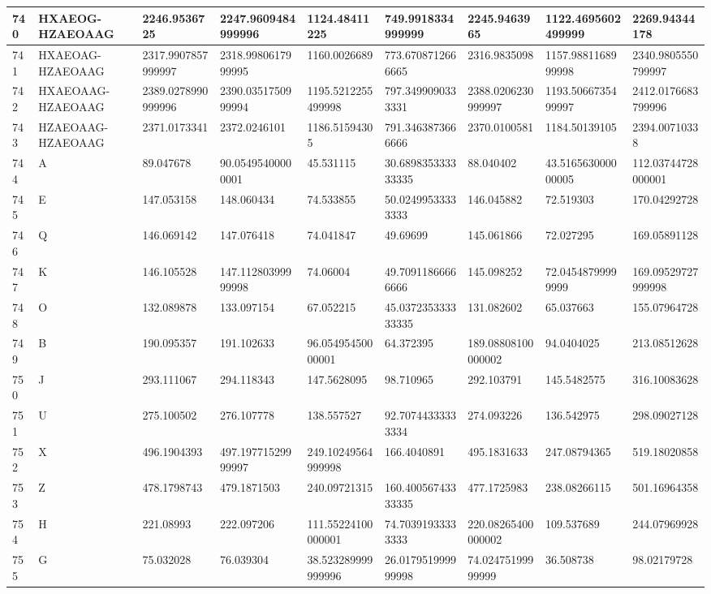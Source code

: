 {\begin{longtable}{|l|l|l|l|l|l|l|l|l|}
        740 & HXAEOG-HZAEOAAG & 2246.9536725 & 2247.9609484999996 & 1124.48411225 & 749.9918334999999 & 2245.9463965 & 1122.4695602499999 & 2269.94344178 \\ \hline
        741 & HXAEOAG-HZAEOAAG & 2317.9907857999997 & 2318.9980617999995 & 1160.0026689 & 773.6708712666665 & 2316.9835098 & 1157.9881168999998 & 2340.9805550799997 \\ \hline
        742 & HXAEOAAG-HZAEOAAG & 2389.0278990999996 & 2390.0351750999994 & 1195.5212255499998 & 797.3499090333331 & 2388.0206230999997 & 1193.5066735499997 & 2412.0176683799996 \\ \hline
        743 & HZAEOAAG-HZAEOAAG & 2371.0173341 & 2372.0246101 & 1186.51594305 & 791.3463873666666 & 2370.0100581 & 1184.50139105 & 2394.00710338 \\ \hline
        744 & A & 89.047678 & 90.05495400000001 & 45.531115 & 30.689835333333335 & 88.040402 & 43.516563000000005 & 112.03744728000001 \\ \hline
        745 & E & 147.053158 & 148.060434 & 74.533855 & 50.02499533333333 & 146.045882 & 72.519303 & 170.04292728 \\ \hline
        746 & Q & 146.069142 & 147.076418 & 74.041847 & 49.69699 & 145.061866 & 72.027295 & 169.05891128 \\ \hline
        747 & K & 146.105528 & 147.11280399999998 & 74.06004 & 49.70911866666666 & 145.098252 & 72.04548799999999 & 169.09529727999998 \\ \hline
        748 & O & 132.089878 & 133.097154 & 67.052215 & 45.037235333333335 & 131.082602 & 65.037663 & 155.07964728 \\ \hline
        749 & B & 190.095357 & 191.102633 & 96.05495450000001 & 64.372395 & 189.08808100000002 & 94.0404025 & 213.08512628 \\ \hline
        750 & J & 293.111067 & 294.118343 & 147.5628095 & 98.710965 & 292.103791 & 145.5482575 & 316.10083628 \\ \hline
        751 & U & 275.100502 & 276.107778 & 138.557527 & 92.70744333333334 & 274.093226 & 136.542975 & 298.09027128 \\ \hline
        752 & X & 496.1904393 & 497.19771529999997 & 249.10249564999998 & 166.4040891 & 495.1831633 & 247.08794365 & 519.18020858 \\ \hline
        753 & Z & 478.1798743 & 479.1871503 & 240.09721315 & 160.40056743333335 & 477.1725983 & 238.08266115 & 501.16964358 \\ \hline
        754 & H & 221.08993 & 222.097206 & 111.55224100000001 & 74.70391933333333 & 220.08265400000002 & 109.537689 & 244.07969928 \\ \hline
        755 & G & 75.032028 & 76.039304 & 38.523289999999996 & 26.017951999999998 & 74.02475199999999 & 36.508738 & 98.02179728 \\ \hline
\end{longtable}}